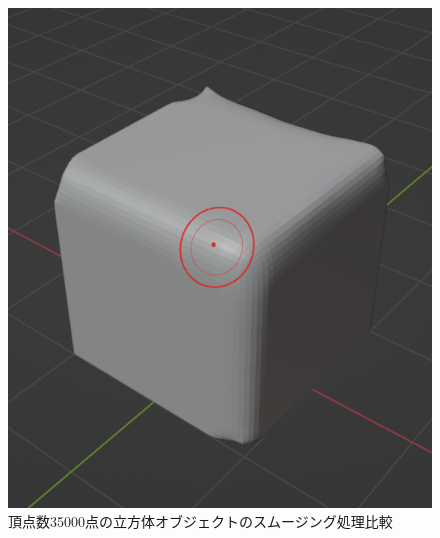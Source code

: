 \documentclass{ltjsreport}
\begin{document}
\begin{figure}[H]
\begin{minipage}{0.25\columnwidth}
			\includegraphics[width = \columnwidth]{../figs/SmoothingAfterCube.png}
			\end{minipage}
			\caption{頂点数35000点の立方体オブジェクトのスムージング処理比較}
			\label{fig:smoothingEX}
			\end{figure}
\vspace{-15pt}
\end{document}

